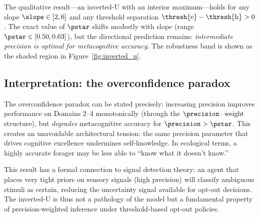 The qualitative result---an inverted-U with an interior maximum---holds for any slope $\slope \in [2, 6]$
and any threshold separation $\thresh{\text{e}} - \thresh{\text{h}} > 0$. The exact value of $\pstar$
shifts modestly with slope (range $\pstar \in [0.50, 0.63]$), but the directional prediction remains:
\emph{intermediate precision is optimal for metacognitive accuracy}. The robustness band is shown as the
shaded region in Figure~\ref{fig:inverted_u}.

\subsection*{Interpretation: the overconfidence paradox}
\label{sec:analytical:paradox}

The overconfidence paradox can be stated precisely: increasing precision improves performance on
Domains 2--4 monotonically (through the $\precision \cdot \text{weight}$ structure), but
\emph{degrades} metacognitive accuracy for $\precision > \pstar$. This creates an unavoidable
architectural tension: the same precision parameter that drives cognitive excellence undermines
self-knowledge. In ecological terms, a highly accurate forager may be less able to
``know what it doesn't know.''

This result has a formal connection to signal detection theory: an agent that places very tight priors
on sensory signals (high precision) will classify ambiguous stimuli as certain, reducing the
uncertainty signal available for opt-out decisions. The inverted-U is thus not a pathology of the
model but a fundamental property of precision-weighted inference under threshold-based opt-out
policies.
